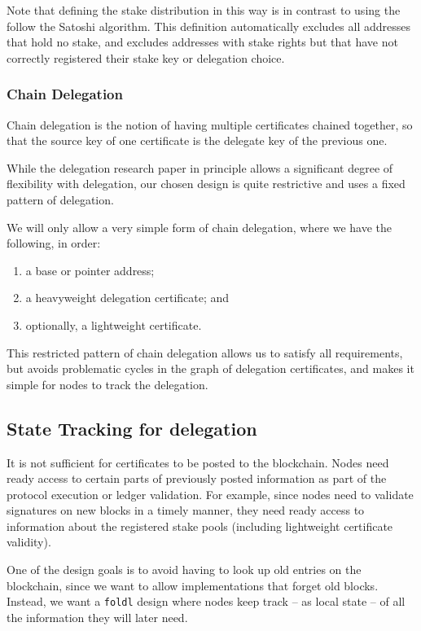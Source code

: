 \documentclass[11pt,a4paper]{article}
\begin{document}
Note that defining the stake distribution in this way is in contrast to
using the follow the Satoshi algorithm. This definition automatically
excludes all addresses that hold no stake, and excludes addresses with
stake rights but that have not correctly registered their stake key or
delegation choice.

\subsubsection{Chain Delegation}
\label{chain-delegation}

Chain delegation is the notion of having multiple certificates chained
together, so that the source key of one certificate is the delegate key
of the previous one.

While the delegation research paper in principle allows a significant
degree of flexibility with delegation, our chosen design is quite
restrictive and uses a fixed pattern of delegation.

We will only allow a very simple form of chain delegation, where we have
the following, in order:

\begin{enumerate}
\item
  a base or pointer address;
\item
  a heavyweight delegation certificate; and
\item
  optionally, a lightweight certificate.
\end{enumerate}

This restricted pattern of chain delegation allows us to satisfy all
requirements, but avoids problematic cycles in the graph of delegation
certificates, and makes it simple for nodes to track the delegation.

\subsection{State Tracking for delegation}
\label{state-tracking-for-delegation}

It is not sufficient for certificates to be posted to the blockchain.
Nodes need ready access to certain parts of previously posted
information as part of the protocol execution or ledger validation. For
example, since nodes need to validate signatures on new blocks in a
timely manner, they need ready access to information about the registered
stake pools (including lightweight certificate validity).

One of the design goals is to avoid having to look up old entries on the
blockchain, since we want to allow implementations that forget old
blocks. Instead, we want a {\tt foldl} design where nodes keep track -- as
local state -- of all the information they will later need.
\end{document}
